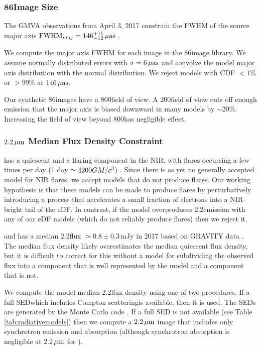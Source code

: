 \subsubsection{86\GHz Image Size}

The GMVA observations from April 3, 2017 constrain the FWHM of the source major axis ${\rm FWHM}_{maj} = 146^{+11}_{-12}\,\mathrm{\mu as}$ \citep[95\% confidence][]{2021ApJ...915...99I}.

We compute the major axis FWHM for each image in the 86\GHz image library.  We assume normally distributed errors with $\sigma = 6\,\mathrm{\mu as}$ and convolve the model major axis distribution with the normal distribution.  We reject models with CDF $< 1\%$ or $> 99\%$ at $146\,\mathrm{\mu as}$.

Our synthetic 86\GHz images have a 800\uas field of view.  A 200\uas field of view cuts off enough emission that the major axis is biased downward in many models by $\sim 20\%$.  Increasing the field of view beyond 800\uas has negligible effect.

\subsubsection{$2.2\,\mu\mathrm{m}$ Median Flux Density Constraint}\label{subsec:nir}

\sgra has a quiescent and a flaring component in the NIR, with flares occurring a few times per day 
(1 day $\simeq 4200 GM/c^3$) \citep{2018ApJ...863...15W}.  Since there is as yet no generally accepted model for NIR flares, we accept models that do not produce flares.  Our working hypothesis is that these models can be made to produce flares by perturbatively introducing a process that accelerates a small fraction of electrons into a  NIR-bright tail of the eDF.  In contrast, if the model overproduces 2.2\um emission with any of our eDF models (which do not reliably produce flares) then we reject it.

\sgra and has a median 2.2\um flux $\simeq 0.8 \pm 0.3\,\mathrm{mJy}$ in 2017 based on GRAVITY data \citep[][see Table 1]{2020A&A...638A...2G}.  The median flux density likely overestimates the median quiescent flux density, but it is difficult to correct for this without a model for subdividing the observed flux into a component that is well represented by the model and a component that is not.  

We compute the model median 2.2\um flux density using one of two procedures.  If a full SED\textemdash which includes Compton scattering\textemdash is available, then it is used. The SEDs are generated by the \grmonty Monte Carlo code \citep{2009ApJS..184..387D, Wong_2022}. If a full SED is not available (see Table \ref{tab:radiativemodels}) then we compute a $2.2\,\mu\mathrm{m}$ image that includes only synchrotron emission and absorption (although synchrotron absorption is negligible at $2.2\,\mu\mathrm{m}$ for \sgra).

